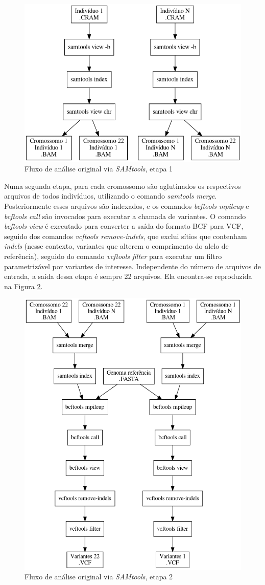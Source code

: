 \documentclass[cic,tc]{iiufrgs}
\begin{document}
\begin{figure}
  \caption{Fluxo de análise original via \textit{SAMtools}, etapa 1}
    \begin{center}
      \includegraphics[width=0.85\linewidth]{img/stage1_orig.png}
    \end{center}
    \label{fig:stage1_orig}
\end{figure}

Numa segunda etapa, para cada cromossomo são aglutinados os respectivos
arquivos de todos indivíduos, utilizando o comando \textit{samtools merge}.
Posteriormente esses arquivos são indexados, e os comandos \textit{bcftools
mpileup} e \textit{bcftools call} são invocados para executar a chamada de
variantes. O comando \textit{bcftools view} é executado para converter a saída
do formato BCF para VCF, seguido dos comandos \textit{vcftools remove-indels},
que exclui sítios que contenham \textit{indels} (nesse contexto, variantes que
alterem o comprimento do alelo de referência), seguido do comando
\textit{vcftools filter} para executar um filtro parametrizável por variantes de
interesse. Independente do número de arquivos de entrada, a saída dessa etapa é
sempre 22 arquivos. Ela encontra-se reproduzida na
Figura \ref{fig:stage2_orig}.

\begin{figure}
  \caption{Fluxo de análise original via \textit{SAMtools}, etapa 2}
    \begin{center}
      \includegraphics[width=0.45\linewidth]{img/stage2_orig.png}
    \end{center}
    \label{fig:stage2_orig}
\end{figure}
\end{document}
